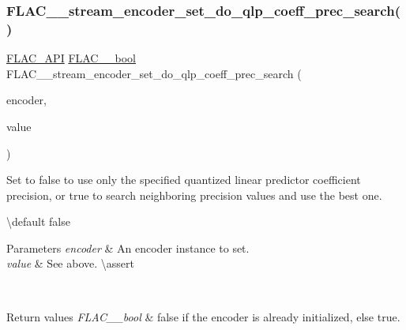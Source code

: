 \subsubsection{\texorpdfstring{FLAC\_\_stream\_encoder\_set\_do\_qlp\_coeff\_prec\_search()}{FLAC\_\_stream\_encoder\_set\_do\_qlp\_coeff\_prec\_search()}}
{\footnotesize\ttfamily \mbox{\hyperlink{group__flac__export_ga56ca07df8a23310707732b1c0007d6f5}{F\+L\+A\+C\+\_\+\+A\+PI}} \mbox{\hyperlink{ordinals_8h_a95103469f1cbd78b8cf250194985b34e}{F\+L\+A\+C\+\_\+\+\_\+bool}} F\+L\+A\+C\+\_\+\+\_\+stream\+\_\+encoder\+\_\+set\+\_\+do\+\_\+qlp\+\_\+coeff\+\_\+prec\+\_\+search (\begin{DoxyParamCaption}\item[{\mbox{\hyperlink{struct_f_l_a_c_____stream_encoder}{F\+L\+A\+C\+\_\+\+\_\+\+Stream\+Encoder}} $\ast$}]{encoder,  }\item[{\mbox{\hyperlink{ordinals_8h_a95103469f1cbd78b8cf250194985b34e}{F\+L\+A\+C\+\_\+\+\_\+bool}}}]{value }\end{DoxyParamCaption})}

Set to {\ttfamily false} to use only the specified quantized linear predictor coefficient precision, or {\ttfamily true} to search neighboring precision values and use the best one.

\textbackslash{}default {\ttfamily false} 
\begin{DoxyParams}{Parameters}
{\em encoder} & An encoder instance to set. \\
\hline
{\em value} & See above. \textbackslash{}assert 
\begin{DoxyCode}{1}
\end{DoxyCode}
 \\
\hline
\end{DoxyParams}

\begin{DoxyRetVals}{Return values}
{\em F\+L\+A\+C\+\_\+\+\_\+bool} & {\ttfamily false} if the encoder is already initialized, else {\ttfamily true}. \\
\hline
\end{DoxyRetVals}
\mbox{\label{group__flac__stream__encoder_ga7b7d294dccd5df7c6c67e75f59798f48}} 
